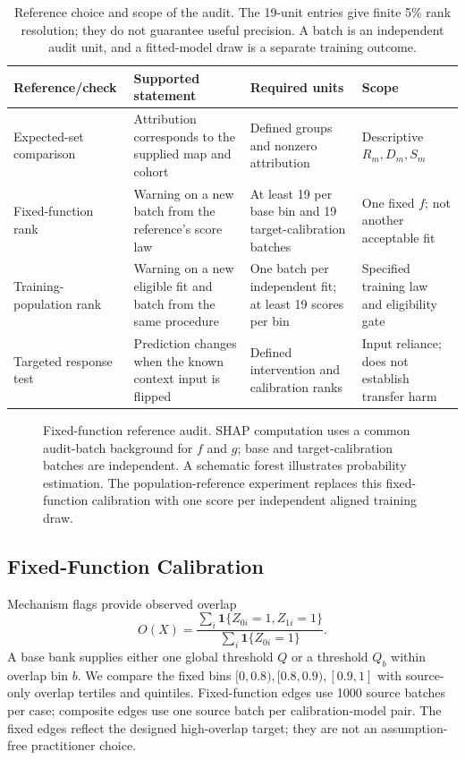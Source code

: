 \documentclass[conference]{IEEEtran}
\begin{document}
\begin{table}[t]
\centering
\caption{Reference choice and scope of the audit. The 19-unit entries give finite 5\% rank resolution; they do not guarantee useful precision. A batch is an independent audit unit, and a fitted-model draw is a separate training outcome.}
\label{tab:reference-scope}
\footnotesize
\begin{tabular}{L{0.18\textwidth}L{0.28\textwidth}L{0.23\textwidth}L{0.21\textwidth}}
\toprule
Reference/check & Supported statement & Required units & Scope \\
\midrule
Expected-set comparison & Attribution corresponds to the supplied map and cohort & Defined groups and nonzero attribution & Descriptive $R_m,D_m,S_m$ \\
Fixed-function rank & Warning on a new batch from the reference's score law & At least 19 per base bin and 19 target-calibration batches & One fixed $f$; not another acceptable fit \\
Training-population rank & Warning on a new eligible fit and batch from the same procedure & One batch per independent fit; at least 19 scores per bin & Specified training law and eligibility gate \\
Targeted response test & Prediction changes when the known context input is flipped & Defined intervention and calibration ranks & Input reliance; does not establish transfer harm \\
\bottomrule
\end{tabular}
\end{table}

\begin{figure}[t]
\centering

\caption{Fixed-function reference audit. SHAP computation uses a common audit-batch background for $f$ and $g$; base and target-calibration batches are independent. A schematic forest illustrates probability estimation. The population-reference experiment replaces this fixed-function calibration with one score per independent aligned training draw.}
\label{fig:workflow}
\end{figure}

\subsection{Fixed-Function Calibration}
Mechanism flags provide observed overlap
\begin{equation}
 O(X)=\frac{\sum_i\mathbf1\{Z_{0i}=1,Z_{1i}=1\}}{\sum_i\mathbf1\{Z_{0i}=1\}}.
\end{equation}
A base bank supplies either one global threshold $Q$ or a threshold $Q_b$ within overlap bin $b$. We compare the fixed bins $[0,0.8),[0.8,0.9),[0.9,1]$ with source-only overlap tertiles and quintiles. Fixed-function edges use 1000 source batches per case; composite edges use one source batch per calibration-model pair. The fixed edges reflect the designed high-overlap target; they are not an assumption-free practitioner choice.
\end{document}
